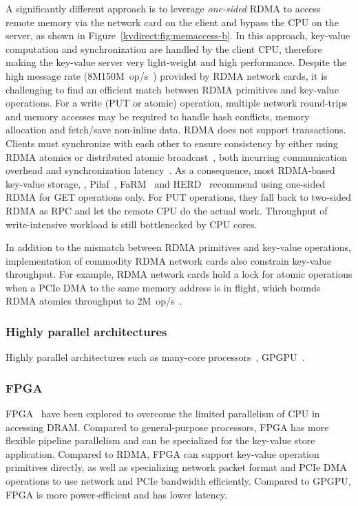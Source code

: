 {{A significantly different approach is to leverage \textit{one-sided} RDMA to access remote memory via the network card on the client and bypass the CPU on the server, as shown in Figure~\ref{kvdirect:fig:memaccess-b}.
In this approach, key-value computation and synchronization are handled by the client CPU, therefore making the key-value server very light-weight and high performance.
Despite the high message rate (8M\approx150M~op/s~\cite{kalia2016design}) provided by RDMA network cards, it is challenging to find an efficient match between RDMA primitives and key-value operations.
For a write (PUT or atomic) operation, multiple network round-trips and memory accesses may be required to handle hash conflicts, memory allocation and fetch/save non-inline data.
RDMA does not support transactions. Clients must synchronize with each other to ensure consistency by either using RDMA atomics or distributed atomic broadcast~\cite{szepesi2014designing}, both incurring communication overhead and synchronization latency~\cite{mitchell2013using, dragojevic2014farm}.
As a consequence, most RDMA-based key-value storage, \eg, Pilaf~\cite{mitchell2013using}, FaRM~\cite{dragojevic2014farm} and HERD~\cite{kalia2014using} recommend using one-sided RDMA for GET operations only. For PUT operations, they fall back to two-sided RDMA as RPC and let the remote CPU do the actual work. Throughput of write-intensive workload is still bottlenecked by CPU cores.

In addition to the mismatch between RDMA primitives and key-value operations, implementation of commodity RDMA network cards also constrain key-value throughput. For example, RDMA network cards hold a lock for atomic operations when a PCIe DMA to the same memory address is in flight, which bounds RDMA atomics throughput to \approx2M~op/s~\cite{kalia2016design}.

\subsubsection{Highly parallel architectures}

Highly parallel architectures such as many-core processors~\cite{berezecki2011many}, GPGPU~\cite{zhang2015mega}.

\subsubsection{FPGA}

FPGA~\cite{istvan2013flexible, chalamalasetti2013fpga, maohardware, lavasani2014fpga, istvan2015hash, istvan2016consensus, kvs-openpower, istvan2015hash, sidler2015scalable, blott2015scaling} have been explored to overcome the limited parallelism of CPU in accessing DRAM.
Compared to general-purpose processors, FPGA has more flexible pipeline parallelism and can be specialized for the key-value store application.
Compared to RDMA, FPGA can support key-value operation primitives directly, as well as specializing network packet format and PCIe DMA operations to use network and PCIe bandwidth efficiently.
Compared to GPGPU, FPGA is more power-efficient and has lower latency.

}}
